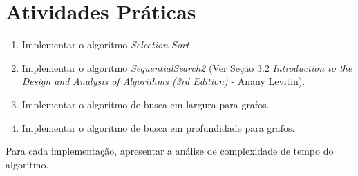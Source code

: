 \documentclass{article}
\begin{document}
\section{Atividades Práticas}

\begin{enumerate}
    \item Implementar o algoritmo \textit{Selection Sort}
    \item Implementar o algoritmo \textit{SequentialSearch2} (Ver Seção 3.2  \textit{Introduction to the Design and Analysis of Algorithms (3rd Edition)} - Anany Levitin).
    \item Implementar o algoritmo de busca em largura para grafos.
    \item Implementar o algoritmo de busca em profundidade para grafos.
    
\end{enumerate}

Para cada implementação, apresentar a análise de complexidade de tempo do algoritmo.


%
%
\end{document}

